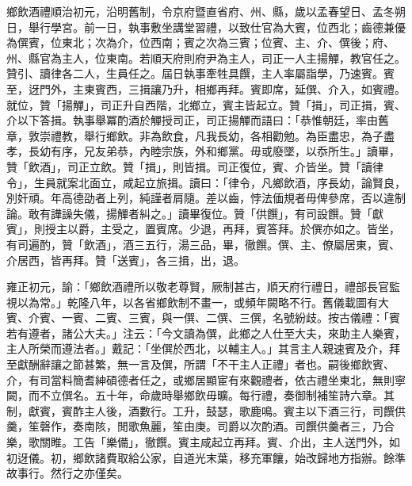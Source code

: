 \begin{pinyinscope}
鄉飲酒禮順治初元，沿明舊制，令京府暨直省府、州、縣，歲以孟春望日、孟冬朔日，舉行學宮。前一日，執事敷坐講堂習禮，以致仕官為大賓，位西北；齒德兼優為僎賓，位東北；次為介，位西南；賓之次為三賓；位賓、主、介、僎後；府、州、縣官為主人，位東南。若順天府則府尹為主人，司正一人主揚觶，教官任之。贊引、讀律各二人，生員任之。屆日執事牽牲具饌，主人率屬詣學，乃速賓。賓至，迓門外，主東賓西，三揖讓乃升，相鄉再拜。賓即席，延僎、介入，如賓禮。就位，贊「揚觶」，司正升自西階，北鄉立，賓主皆起立。贊「揖」，司正揖，賓、介以下答揖。執事舉冪酌酒於觶授司正，司正揚觶而語曰：「恭惟朝廷，率由舊章，敦崇禮教，舉行鄉飲。非為飲食，凡我長幼，各相勸勉。為臣盡忠，為子盡孝，長幼有序，兄友弟恭，內睦宗族，外和鄉黨。毋或廢墜，以忝所生。」讀畢，贊「飲酒」，司正立飲。贊「揖」，則皆揖。司正復位，賓、介皆坐。贊「讀律令」，生員就案北面立，咸起立旅揖。讀曰：「律令，凡鄉飲酒，序長幼，論賢良，別奸頑。年高德劭者上列，純謹者肩隨。差以齒，悖法偭規者毋俾參席，否以違制論。敢有譁譟失儀，揚觶者糾之。」讀畢復位。贊「供饌」，有司設饌。贊「獻賓」，則授主以爵，主受之，置賓席。少退，再拜，賓答拜。於僎亦如之。皆坐，有司遍酌，贊「飲酒」，酒三五行，湯三品，畢，徹饌。僎、主、僚屬居東，賓、介居西，皆再拜。贊「送賓」，各三揖，出，退。

雍正初元，諭：「鄉飲酒禮所以敬老尊賢，厥制甚古，順天府行禮日，禮部長官監視以為常。」乾隆八年，以各省鄉飲制不畫一，或頻年闕略不行。舊儀載圖有大賓、介賓、一賓、二賓、三賓，與一僎、二僎、三僎，名號紛歧。按古儀禮：「賓若有遵者，諸公大夫。」注云：「今文讀為僎，此鄉之人仕至大夫，來助主人樂賓，主人所榮而遵法者。」戴記：「坐僎於西北，以輔主人。」其言主人親速賓及介，拜至獻酬辭讓之節甚繁，無一言及僎，所謂「不干主人正禮」者也。嗣後鄉飲賓、介，有司當料簡耆紳碩德者任之，或鄉居顯宦有來觀禮者，依古禮坐東北，無則寧闕，而不立僎名。五十年，命歲時舉鄉飲毋曠。每行禮，奏御制補笙詩六章。其制，獻賓，賓酢主人後，酒數行。工升，鼓瑟，歌鹿鳴。賓主以下酒三行，司饌供羹，笙磬作，奏南陔，閒歌魚麗，笙由庚。司爵以次酌酒。司饌供羹者三，乃合樂，歌關睢。工告「樂備」，徹饌。賓主咸起立再拜。賓、介出，主人送門外，如初迓儀。初，鄉飲諸費取給公家，自道光末葉，移充軍饟，始改歸地方指辦。餘準故事行。然行之亦僅矣。


\end{pinyinscope}